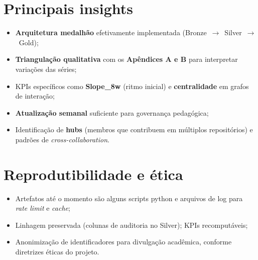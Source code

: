 \documentclass[
	12pt,
	openright,
	oneside,
	a4paper,
	brazil
]{abntex2}
\begin{document}
\begin{apendicesenv}
\section*{Principais insights}
\begin{itemize}
    \item \textbf{Arquitetura medalhão} efetivamente implementada (Bronze~$\rightarrow$~Silver~$\rightarrow$~Gold);
    \item \textbf{Triangulação qualitativa} com os \textbf{Apêndices A e B} para interpretar variações das séries;
    \item KPIs específicos como \textbf{Slope\_8w} (ritmo inicial) e \textbf{centralidade} em grafos de interação;
    \item \textbf{Atualização semanal} suficiente para governança pedagógica;
    \item Identificação de \textbf{hubs} (membros que contribuem em múltiplos repositórios) e padrões de \textit{cross-collaboration}.
\end{itemize}

\section*{Reprodutibilidade e ética}
\begin{itemize}
    \item Artefatos até o momento são alguns scripts python e arquivos de log para \textit{rate limit} e \textit{cache};
    \item Linhagem preservada (colunas de auditoria no Silver); KPIs recomputáveis;
    \item Anonimização de identificadores para divulgação acadêmica, conforme diretrizes éticas do projeto.
\end{itemize}


\end{apendicesenv}
\end{document}
